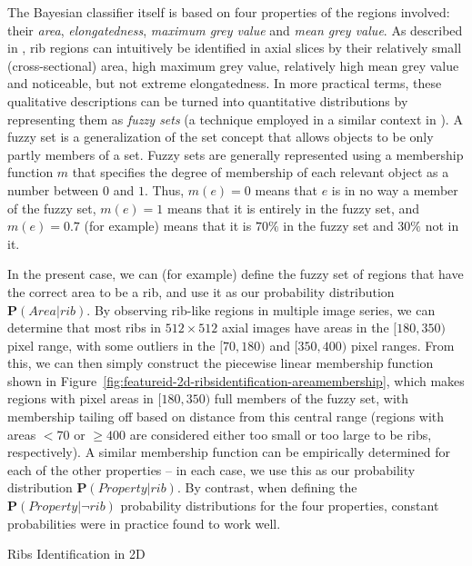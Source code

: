 \noindent The Bayesian classifier itself is based on four properties of the regions involved: their \emph{area}, \emph{elongatedness}, \emph{maximum grey value} and \emph{mean grey value}. As described in \cite{gvccimi08}, rib regions can intuitively be identified in axial slices by their relatively small (cross-sectional) area, high maximum grey value, relatively high mean grey value and noticeable, but not extreme elongatedness. In more practical terms, these qualitative descriptions can be turned into quantitative distributions by representing them as \emph{fuzzy sets} (a technique employed in a similar context in \cite{lee03}). A fuzzy set is a generalization of the set concept that allows objects to be only partly members of a set. Fuzzy sets are generally represented using a membership function $m$ that specifies the degree of membership of each relevant object as a number between $0$ and $1$. Thus, $m(e) = 0$ means that $e$ is in no way a member of the fuzzy set, $m(e) = 1$ means that it is entirely in the fuzzy set, and $m(e) = 0.7$ (for example) means that it is $70\%$ in the fuzzy set and $30\%$ not in it.

In the present case, we can (for example) define the fuzzy set of regions that have the correct area to be a rib, and use it as our probability distribution $\mathbf{P}(\mathit{Area} | \mathit{rib})$. By observing rib-like regions in multiple image series, we can determine that most ribs in $512 \times 512$ axial images have areas in the $[180,350)$ pixel range, with some outliers in the $[70,180)$ and $[350,400)$ pixel ranges. From this, we can then simply construct the piecewise linear membership function shown in Figure~\ref{fig:featureid-2d-ribsidentification-areamembership}, which makes regions with pixel areas in $[180,350)$ full members of the fuzzy set, with membership tailing off based on distance from this central range (regions with areas $< 70$ or $\ge 400$ are considered either too small or too large to be ribs, respectively). A similar membership function can be empirically determined for each of the other properties -- in each case, we use this as our probability distribution $\mathbf{P}(\mathit{Property} | \mathit{rib})$. By contrast, when defining the $\mathbf{P}(\mathit{Property} | \neg\mathit{rib})$ probability distributions for the four properties, constant probabilities were in practice found to work well.

\begin{stulisting}[p]
\caption{Ribs Identification in 2D}
\label{code:featureid-2d-ribsidentification}

\end{stulisting}

